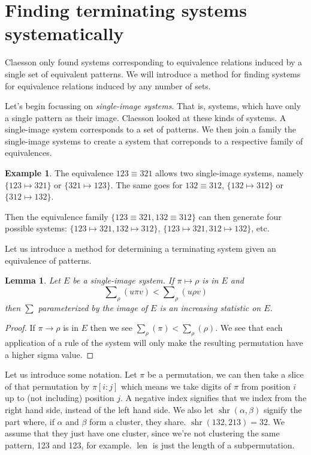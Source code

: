 \documentclass[a4paper, 11pt]{article}
\newtheorem{lemma}[theorem]{Lemma}
\theoremstyle{definition}
\newtheorem{example}[theorem]{Example}
\DeclareMathOperator{\len}{len}
\DeclareMathOperator{\shr}{shr}
\begin{document}
\section{Finding terminating systems systematically}
Claesson only found systems corresponding to equivalence relations induced by a
single set of equivalent patterns. We will introduce a method for finding
systems for equivalence relations induced by any number of sets.

Let's begin focussing on \emph{single-image systems}. That is, systems, which
have only a single pattern as their image. Claesson looked at these kinds
of systems. A single-image system corresponds to a set of patterns.
We then join a family the single-image systems to
create a system that correponds to a respective family of equivalences.

\begin{example}
    The equivalence $123 \equiv 321$ allows two single-image systems, namely
    $\{123 \mapsto 321\}$ or $\{321 \mapsto 123\}$. The same goes for $132 \equiv 312$,
    $\{132 \mapsto 312\}$ or $\{312 \mapsto 132\}$.

    Then the equivalence family $\{123 \equiv 321, 132 \equiv 312\}$ can then generate
    four possible systems: $\{123 \mapsto 321, 132 \mapsto 312\}$, $\{123 \mapsto 321,
    312 \mapsto 132\}$, etc.
\end{example}

Let us introduce a method for determining a terminating system given an
equivalence of patterns.

\begin{lemma}
    Let $E$ be a single-image system. If $\pi \mapsto \rho$ is in $E$ and 
    \[
        \sum\nolimits_\rho(u\pi v) < \sum\nolimits_\rho(u \rho v) \tag{$\ast$}
        \label{increasingimage}
    \]
    then $\sum$ parameterized by the image of $E$ is an increasing statistic on
    $E$.
\end{lemma}
\begin{proof}
    If $\pi \to \rho$ is in $E$ then we see $\sum_\rho(\pi) <
    \sum_\rho(\rho)$.  We see that each application of a rule of the system
    will only make the resulting permutation have a higher sigma value.
\end{proof}

Let us introduce some notation. Let $\pi$ be a permutation, we can then take a
slice of that permutation by $\pi[i:j]$ which means we take digits of $\pi$ from
position $i$ up to (not including) position $j$. A negative index signifies that
we index from the right hand side, instead of the left hand side. We also let $\shr(\alpha,
\beta)$ signify the part where, if $\alpha$ and $\beta$ form a cluster, they
share. $\shr(132, 213) = 32$. We assume that they just have one cluster, since
we're not clustering the same pattern, 123 and 123, for example. $\len$ is just
the length of a subpermutation.
\end{document}
